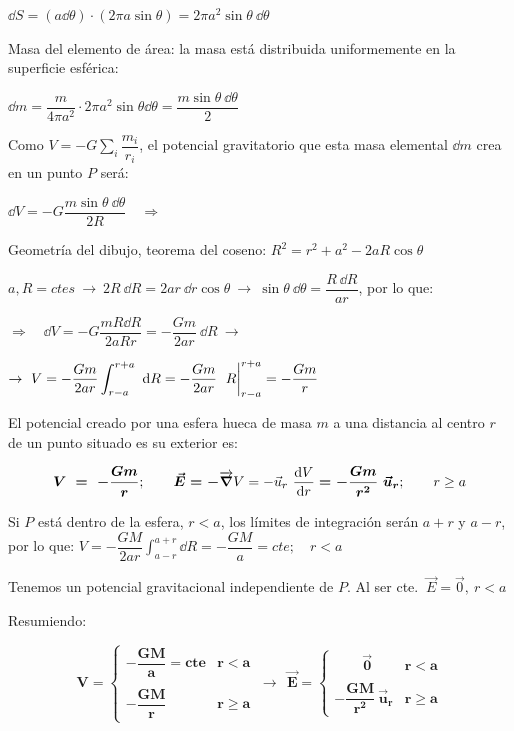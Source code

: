 $\dd S= (a\dd \theta)\cdot (2\pi a \sin \theta)=2\pi a^2 \sin \theta \ \dd \theta$

Masa del elemento de área: la masa está distribuida uniformemente en la superficie esférica:

$\dd m=\dfrac m{4\pi a^2}\cdot 2\pi a^2 \sin \theta \dd \theta = \dfrac{m \sin \theta \ \dd \theta}2$

Como $\displaystyle V=-G \sum_i \dfrac {m_i}{r_i}$, el potencial gravitatorio que esta masa elemental $\dd m$ crea en un punto $P$ será:

$\dd V =- G \dfrac{m \sin \theta \ \dd \theta}{2R} \quad \Rightarrow$

Geometría del dibujo, teorema del coseno: $R^2=r^2+a^2-2aR\cos \theta$

$a, R = ctes \ \to \ 2R \ \dd R=2ar \ \dd r \cos \theta \ \to \ \sin \theta \ \dd \theta =\dfrac {R \ \dd R}{ar}$, por lo que:

$\Rightarrow \quad \dd V=-G\dfrac{m R \dd R}{2aRr}=-\dfrac{Gm}{2ar} \ \dd R \ \to $

$\to \  V=-\dfrac{Gm}{2ar} \displaystyle \int_{r-a}^{r+a} \ \dd R 
=-\dfrac{Gm}{2ar} \ \eval{ R }_{r-a}^{r+a}= -\dfrac{Gm}{r} $

El potencial creado por una esfera hueca de masa $m$ a una distancia al centro $r$ de un punto situado es su exterior es:

$$\boldsymbol{ V \ = \  -\dfrac{Gm}{r}};  \qquad \boldsymbol{ \vec E=-}\overrightarrow{\grad} V =-\vec u_r \ \displaystyle \dv{V}{r} \boldsymbol{ = -\dfrac{Gm}{r^2} \ \vec u_r}; \qquad r\geq a$$

Si $P$ está dentro de la esfera, $r<a$, los límites de integración serán $a+r$ y $a-r$, por lo que:
$V=-\dfrac{GM}{2ar} \displaystyle \int_{a-r}^{a+r} \dd R
=-\dfrac{GM}{a}=cte;\quad r<a$

Tenemos un potencial gravitacional independiente de $P$. Al ser cte. $\ \vec E =\vec 0,\ r<a$

Resumiendo:

$$\boldsymbol{
V=\begin{cases}
-\dfrac{GM}{a}=cte & r<a \\ \\ 
-\dfrac{GM}{r} & r\geq a	
\end{cases} \ \rightarrow \ 
\ \vec E=
\begin{cases}
	\qquad \vec 0 & r<a \\ \\ 
	-\dfrac{GM}{r^2}\ \vec u_r & r\geq a	
\end{cases}
}$$


